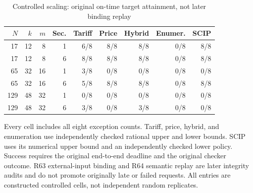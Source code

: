 \documentclass[11pt,letterpaper]{article}
\theoremstyle{definition}\newtheorem{remark}[theorem]{Remark}
\begin{document}
\begin{table}[p]\centering\caption{Controlled scaling: original on-time target attainment, not later binding replay}\label{tab:scaling63}
\begin{singlespace}\small\begin{tabular}{rrrrrrrrr}\toprule
$N$ & $k$ & $m$ & Sec. & Tariff & Price & Hybrid & Enumer. & SCIP\\\midrule
17 & 12 & 8 & 1 & 6/8 & 8/8 & 8/8 & 0/8 & 8/8 \\
17 & 12 & 8 & 6 & 8/8 & 8/8 & 8/8 & 0/8 & 8/8 \\
65 & 32 & 16 & 1 & 3/8 & 0/8 & 0/8 & 0/8 & 0/8 \\
65 & 32 & 16 & 6 & 5/8 & 8/8 & 8/8 & 0/8 & 8/8 \\
129 & 48 & 32 & 1 & 0/8 & 0/8 & 0/8 & 0/8 & 0/8 \\
129 & 48 & 32 & 6 & 3/8 & 0/8 & 3/8 & 0/8 & 0/8 \\
\bottomrule\end{tabular}\par\smallskip\begin{minipage}{\textwidth}\footnotesize Every cell includes all eight exception counts. Tariff, price, hybrid, and enumeration use independently checked rational upper and lower bounds. SCIP uses its numerical upper bound and an independently checked lower policy. Success requires the original end-to-end deadline and the original checker outcome. R63 external-input binding and R64 semantic replay are later integrity audits and do not promote originally late or failed requests. All entries are constructed controlled cells, not independent random replicates.\end{minipage}\end{singlespace}\end{table}
\end{document}
